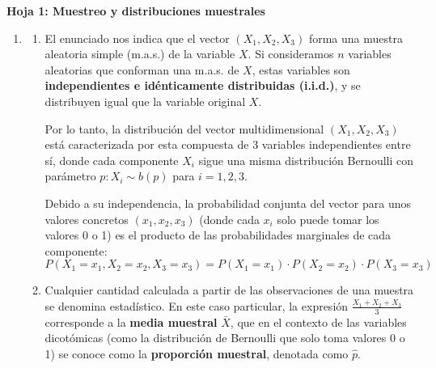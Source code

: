\begin{center}
	\Large \textbf{Hoja 1: Muestreo y distribuciones muestrales}
\end{center}


\begin{enumerate}[label=\color{red}\textbf{\arabic*)}]
	\item {}
	      \begin{enumerate}[label=\color{red}\textbf{\alph*)}]
		      \item {}

		            El enunciado nos indica que el vector $(X_1,X_2,X_3)$ forma una muestra aleatoria simple (m.a.s.) de la variable $X$. Si consideramos  $n$ variables aleatorias que conforman una m.a.s. de  $X$, estas variables son  \textbf{independientes e idénticamente distribuidas (i.i.d.)}, y se distribuyen igual que la variable original $X$.

		            Por lo tanto, la distribución del vector multidimensional $(X_1,X_2,X_3)$ está caracterizada por esta compuesta de 3 variables independientes entre sí, donde cada componente $X_i$ sigue una misma distribución Bernoulli con parámetro  $p:X_i\sim b(p)$ para $i=1,2,3$.

		            Debido a su independencia, la probabilidad conjunta del vector para unos valores concretos  $(x_1,x_2,x_3)$ (donde cada $x_i$ solo puede tomar los valores 0 o 1) es el producto de las probabilidades marginales de cada componente:
		            \[
			            P(X_1=x_1,X_2=x_2,X_3=x_3)=P(X_1=x_1)\cdot P(X_2=x_2)\cdot P(X_3=x_3)
		            \]
		      \item {}

		            Cualquier cantidad calculada a partir de las observaciones de una muestra se denomina estadístico. En este caso particular, la expresión $\frac{X_1+X_2+X_3}{3}$ corresponde a la \textbf{media muestral} $\bar{X}$, que en el contexto de las variables dicotómicas (como la distribución de Bernoulli que solo toma valores 0 o 1) se conoce como la \textbf{proporción muestral}, denotada como $\hat{p}$.


\end{enumerate}
\end{enumerate}
